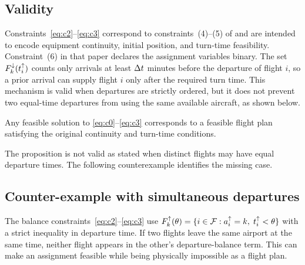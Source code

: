 \subsection{Validity}

Constraints~\eqref{eq:c2}--\eqref{eq:c3} correspond to constraints~(4)--(5)
of \citet{khaled2018compact} and are intended to encode equipment continuity,
initial position, and turn-time feasibility. Constraint~(6) in that paper
declares the assignment variables binary.
The set $F^{\downarrow}_{k}(t^{\uparrow}_{i})$ counts only arrivals at least $\Delta t$ minutes before
the departure of flight $i$, so a prior arrival can supply flight $i$ only
after the required turn time. This mechanism is valid when departures are
strictly ordered, but it does not prevent two equal-time departures from using
the same available aircraft, as shown below.

\begin{proposition}
  Any feasible solution to \eqref{eq:c0}--\eqref{eq:c3}
  corresponds to a
  feasible flight plan satisfying the original continuity and turn-time
  conditions.
\end{proposition}

The proposition is not valid as stated when distinct flights may have equal
departure times. The following counterexample identifies the missing case.

\subsection{Counter-example with simultaneous departures}

The balance constraints~\eqref{eq:c2}--\eqref{eq:c3} use
$F^{\uparrow}_{k}(\theta)=\{i\in\mathcal{F}:a^{\uparrow}_{i}=k,\;t^{\uparrow}_{i}<\theta\}$ with a strict
inequality in departure time. If two flights leave the same airport at the
same time, neither flight appears in the other's departure-balance term.
This can make an assignment feasible while being physically impossible as a
flight plan.

